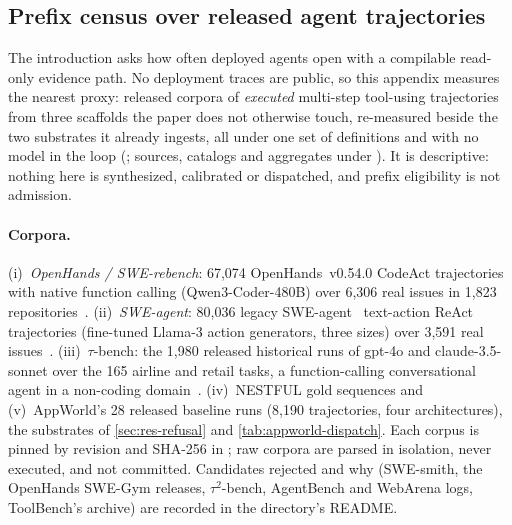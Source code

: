 \subsection{Prefix census over released agent trajectories}
\label{app:prefix-census}

The introduction asks how often deployed agents open with a compilable
read-only evidence path. No deployment traces are public, so this appendix
measures the nearest proxy: released corpora of \emph{executed} multi-step
tool-using trajectories from three scaffolds the paper does not otherwise
touch, re-measured beside the two substrates it already ingests, all under one
set of definitions and with no model in the loop
(; sources, catalogs and aggregates
under ). It is descriptive: nothing here
is synthesized, calibrated or dispatched, and prefix eligibility is not
admission.

\paragraph{Corpora.}
(i)~\emph{OpenHands / SWE-rebench}: 67{,}074 OpenHands~v0.54.0
\citep{wang2024openhands} CodeAct trajectories with native function calling
(Qwen3-Coder-480B) over 6{,}306 real issues in 1{,}823
repositories~\citep{trofimova2025openhands}. (ii)~\emph{SWE-agent}: 80{,}036
legacy SWE-agent~\citep{yang2024sweagent} text-action ReAct trajectories
(fine-tuned Llama-3 action generators, three sizes) over 3{,}591 real
issues~\citep{nebius2024sweagent}. (iii)~$\tau$-bench: the
1{,}980 released historical runs of gpt-4o and claude-3.5-sonnet over the 165
airline and retail tasks, a function-calling conversational agent in a
non-coding domain~\citep{yao2024taubench}. (iv)~NESTFUL gold sequences and (v)~AppWorld's 28
released baseline runs (8{,}190 trajectories, four architectures), the
substrates of \cref{sec:res-refusal} and \cref{tab:appworld-dispatch}. Each
corpus is pinned by revision and SHA-256 in
; raw corpora are parsed
in isolation, never executed, and not committed. Candidates rejected and why
(SWE-smith, the OpenHands SWE-Gym releases, $\tau^2$-bench, AgentBench and
WebArena logs, ToolBench's archive) are recorded in the directory's README.


